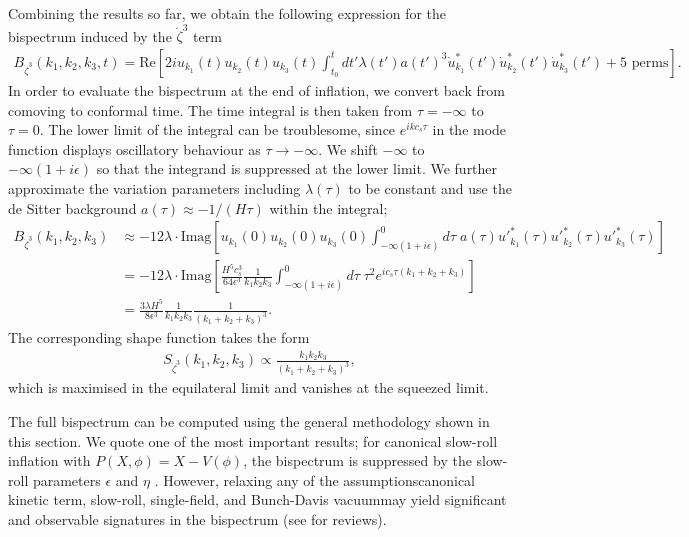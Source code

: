 Combining the results so far, we obtain the following expression for the bispectrum induced by the $\dot{\zeta}^3$ term
\begin{align}
	B_{\dot{\zeta}^3}(k_1,k_2,k_3,t) = \text{Re}\left[ 2i u_{k_1}(t) u_{k_2}(t) u_{k_3}(t) \int_{t_0}^{t} dt' \lambda(t') a(t')^3 \dot{u}^*_{k_1}(t') \dot{u}^*_{k_2}(t') \dot{u}^*_{k_3}(t')   + \text{5 perms} \right].
\end{align}
In order to evaluate the bispectrum at the end of inflation, we convert back from comoving to conformal time. The time integral is then taken from $\tau=-\infty$ to $\tau=0$. The lower limit of the integral can be troublesome, since $e^{i k c_s \tau}$ in the mode function displays oscillatory behaviour as $\tau\rightarrow -\infty$. We shift $-\infty$ to $-\infty(1+i\epsilon)$ so that the integrand is suppressed at the lower limit. We further approximate the variation parameters including $\lambda(\tau)$ to be constant and use the de Sitter background $a(\tau)\approx -1/(H\tau)$ within the integral;
\begin{align}
	B_{\dot{\zeta}^3}(k_1,k_2,k_3) &\approx -12\lambda \cdot \text{Imag}\left[  u_{k_1}(0) u_{k_2}(0) u_{k_3}(0) \int_{-\infty(1+i\epsilon)}^{0} d\tau \;  a(\tau) {u'}^*_{k_1}(\tau) {u'}^*_{k_2}(\tau) {u'}^*_{k_3}(\tau)  \right] \\
	&= -12\lambda \cdot \text{Imag} \left[ \frac{H^5 c_s^3}{64\epsilon^3} \frac{1}{k_1 k_2 k_3} \int_{-\infty(1+i\epsilon)}^{0} d\tau \; \tau^2 e^{ic_s\tau(k_1+k_2+k_3)} \right] \\
	&= \frac{3\lambda H^5}{8\epsilon^3} \frac{1}{k_1 k_2 k_3} \frac{1}{(k_1+k_2+k_3)^3}.
\end{align}
The corresponding shape function takes the form
\begin{align}
	S_{\dot{\zeta}^3}(k_1,k_2,k_3) \propto \frac{k_1 k_2 k_3}{(k_1+k_2+k_3)^3},
\end{align}
which is maximised in the equilateral limit and vanishes at the squeezed limit.

The full bispectrum can be computed using the general methodology shown in this section. We quote one of the most important results; for canonical slow-roll inflation with $P(X,\phi) = X - V(\phi)$, the bispectrum is suppressed by the slow-roll parameters $\epsilon$ and $\eta$ \cite{Maldacena2013}. However, relaxing any of the assumptions\textemdash canonical kinetic term, slow-roll, single-field, and Bunch-Davis vacuum\textemdash may yield significant and observable signatures in the bispectrum (see \cite{Chen2010review,Komatsu2010} for reviews).

